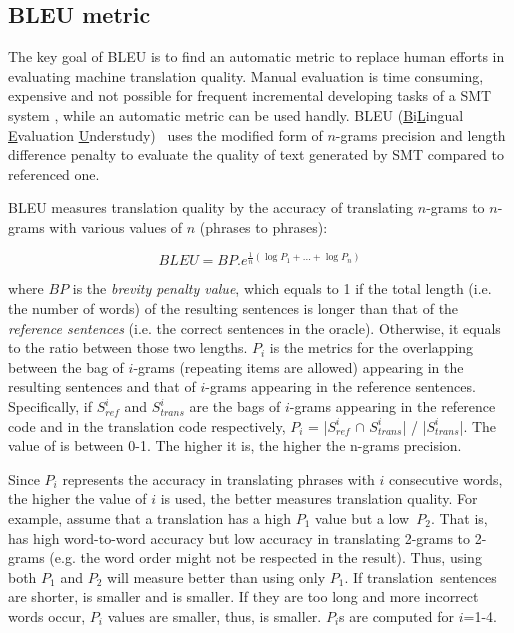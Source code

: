 \subsection{BLEU metric}

The key goal of BLEU is to find an automatic metric to replace human
efforts in evaluating machine translation quality. Manual evaluation
is time consuming, expensive and not possible for frequent incremental
developing tasks of a SMT system \cite{Papineni2002}, while an
automatic metric can be used handly. BLEU
(\underline{B}i\underline{L}ingual \underline{E}valuation
\underline{U}nderstudy)~\cite{Papineni2002} uses the modified form of $n$-grams precision
and length difference penalty to evaluate the quality of text
generated by SMT compared to referenced one.

BLEU measures
translation quality by the accuracy of translating $n$-grams to
$n$-grams with various values of $n$ (phrases to phrases):

\[BLEU = BP.{e^{\frac{1}{n}(\log {P_1} + ... + \log {P_n})}}\]

where $BP$ is the {\em brevity penalty value}, which equals to 1 if
the total length (i.e. the number of words) of the resulting sentences
is longer than that of the {\em reference sentences} (i.e. the correct
sentences in the oracle). Otherwise, it equals to the ratio between
those two lengths. $P_i$ is the metrics for the overlapping between
the bag of $i$-grams (repeating items are allowed) appearing in the
resulting sentences and that of $i$-grams appearing in the reference
sentences. Specifically, if $S^{i}_{ref}$ and $S^{i}_{trans}$ are the
bags of $i$-grams appearing in the reference code and in the
translation code respectively, $P_i$ = |$S^{i}_{ref}$ $\cap$
$S^{i}_{trans}$| / |$S^{i}_{trans}$|. The value of  is
between 0-1. The higher it is, the higher the n-grams precision.

Since $P_i$ represents the accuracy in translating phrases
with $i$ consecutive words, the higher the value of $i$ is used, the
better  measures translation quality. For example, assume
that a translation  has a high $P_1$ value but a
low~$P_2$. That is,  has high word-to-word accuracy but low
accuracy in translating 2-grams to 2-grams (e.g. the word order might
not be respected in the result). Thus, using both $P_1$ and $P_2$ will
measure  better than using only $P_1$. If
translation~sen\-tences are shorter,  is smaller and
 is smaller. If they are too long and more incorrect words
occur, $P_i$ values are smaller, thus,  is smaller. $P_i$s
are computed for $i$=1-4.
